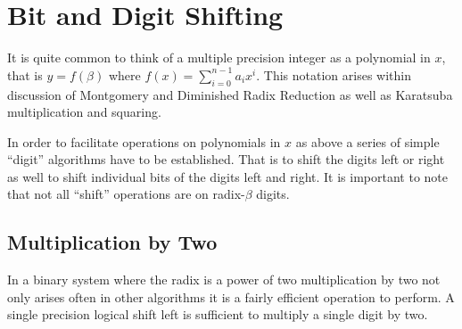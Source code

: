 \documentclass[b5paper]{book}
\begin{document}
\section{Bit and Digit Shifting}
It is quite common to think of a multiple precision integer as a polynomial in $x$, that is $y = f(\beta)$ where $f(x) = \sum_{i=0}^{n-1} a_i x^i$.  
This notation arises within discussion of Montgomery and Diminished Radix Reduction as well as Karatsuba multiplication and squaring.  

In order to facilitate operations on polynomials in $x$ as above a series of simple ``digit'' algorithms have to be established.  That is to shift
the digits left or right as well to shift individual bits of the digits left and right.  It is important to note that not all ``shift'' operations
are on radix-$\beta$ digits.  

\subsection{Multiplication by Two}

In a binary system where the radix is a power of two multiplication by two not only arises often in other algorithms it is a fairly efficient 
operation to perform.  A single precision logical shift left is sufficient to multiply a single digit by two.  
\end{document}
